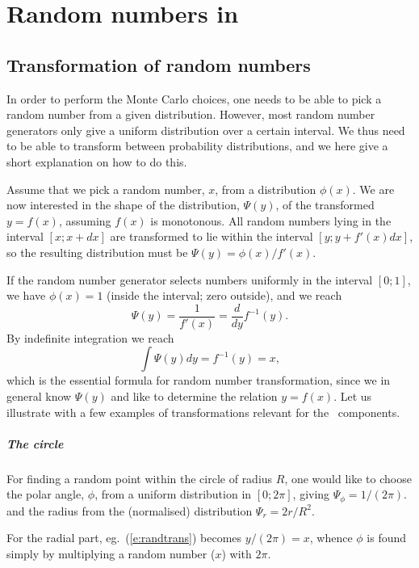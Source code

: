 \chapter{Random numbers in \MCS}
\label{s:random}

\section{Transformation of random numbers}
In order to perform the Monte Carlo choices, one needs to be able to pick a
random number from a given distribution. However, most random number generators
only give a uniform distribution over a certain interval.  We thus need to be
able to transform between probability distributions, and we here give a short
explanation on how to do this.

Assume that we pick a random number, $x$, from a distribution $\phi(x)$.
We are now interested in the shape of the distribution, $\Psi(y)$, of the
transformed $y=f(x)$, assuming $f(x)$ is monotonous.
All random numbers lying in the interval $[x; x+dx]$
are transformed to lie within the interval $[y; y+f'(x)dx]$, so the
resulting distribution must be $\Psi(y) = \phi(x) / f'(x)$.

If the random number generator selects numbers uniformly in the interval
$[0; 1]$, we have $\phi(x) = 1$ (inside the interval; zero outside), and
we reach
\begin{equation}
\Psi(y) = \frac{1}{f'(x)} = \frac{d}{dy} f^{-1}(y) .
\end{equation}
By indefinite integration we reach
\begin{equation}
\label{e:randtrans}
\int \Psi(y) dy = f^{-1}(y) = x ,
\end{equation}
which is the essential formula for random number transformation, since we
in general know $\Psi(y)$ and like to determine the relation $y=f(x)$.
Let us illustrate with a few examples of transformations relevant for the
\MCS\ components.

\paragraph{The circle}
For finding a random point within the
circle of radius $R$, one would like to choose the polar angle, $\phi$,
from a uniform
distribution in $[0; 2\pi]$, giving $\Psi_\phi = 1/(2\pi)$.
and the radius from the (normalised) distribution $\Psi_r=2r/R^2$.

For the radial part,
eg.~(\ref{e:randtrans}) becomes $y/(2 \pi) = x$, whence
$\phi$ is found simply by multiplying a random number ($x$)
with $2\pi$.

